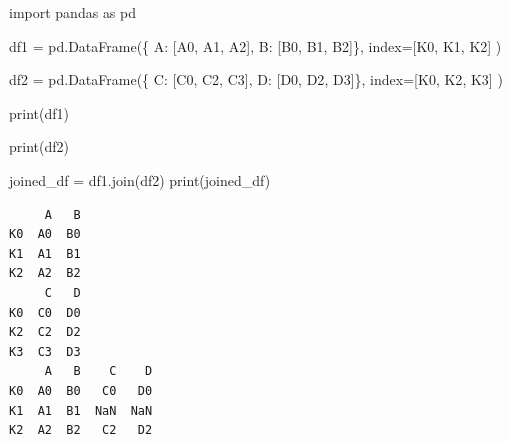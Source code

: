 \documentclass[
  polish,
  letterpaper,
  DIV=11,
  numbers=noendperiod]{scrreprt}
\newenvironment{Shaded}{\begin{snugshade}}{\end{snugshade}}
\newcommand{\BuiltInTok}[1]{\textcolor[rgb]{0.00,0.23,0.31}{#1}}
\newcommand{\ImportTok}[1]{\textcolor[rgb]{0.00,0.46,0.62}{#1}}
\newcommand{\NormalTok}[1]{\textcolor[rgb]{0.00,0.23,0.31}{#1}}
\newcommand{\OperatorTok}[1]{\textcolor[rgb]{0.37,0.37,0.37}{#1}}
\newcommand{\StringTok}[1]{\textcolor[rgb]{0.13,0.47,0.30}{#1}}
\begin{document}
\begin{Shaded}
\begin{Highlighting}[]
\ImportTok{import}\NormalTok{ pandas }\ImportTok{as}\NormalTok{ pd}

\NormalTok{df1 }\OperatorTok{=}\NormalTok{ pd.DataFrame(\{}
    \StringTok{\textquotesingle{}A\textquotesingle{}}\NormalTok{: [}\StringTok{\textquotesingle{}A0\textquotesingle{}}\NormalTok{, }\StringTok{\textquotesingle{}A1\textquotesingle{}}\NormalTok{, }\StringTok{\textquotesingle{}A2\textquotesingle{}}\NormalTok{],}
    \StringTok{\textquotesingle{}B\textquotesingle{}}\NormalTok{: [}\StringTok{\textquotesingle{}B0\textquotesingle{}}\NormalTok{, }\StringTok{\textquotesingle{}B1\textquotesingle{}}\NormalTok{, }\StringTok{\textquotesingle{}B2\textquotesingle{}}\NormalTok{]\},}
\NormalTok{    index}\OperatorTok{=}\NormalTok{[}\StringTok{\textquotesingle{}K0\textquotesingle{}}\NormalTok{, }\StringTok{\textquotesingle{}K1\textquotesingle{}}\NormalTok{, }\StringTok{\textquotesingle{}K2\textquotesingle{}}\NormalTok{]}
\NormalTok{)}

\NormalTok{df2 }\OperatorTok{=}\NormalTok{ pd.DataFrame(\{}
    \StringTok{\textquotesingle{}C\textquotesingle{}}\NormalTok{: [}\StringTok{\textquotesingle{}C0\textquotesingle{}}\NormalTok{, }\StringTok{\textquotesingle{}C2\textquotesingle{}}\NormalTok{, }\StringTok{\textquotesingle{}C3\textquotesingle{}}\NormalTok{],}
    \StringTok{\textquotesingle{}D\textquotesingle{}}\NormalTok{: [}\StringTok{\textquotesingle{}D0\textquotesingle{}}\NormalTok{, }\StringTok{\textquotesingle{}D2\textquotesingle{}}\NormalTok{, }\StringTok{\textquotesingle{}D3\textquotesingle{}}\NormalTok{]\},}
\NormalTok{    index}\OperatorTok{=}\NormalTok{[}\StringTok{\textquotesingle{}K0\textquotesingle{}}\NormalTok{, }\StringTok{\textquotesingle{}K2\textquotesingle{}}\NormalTok{, }\StringTok{\textquotesingle{}K3\textquotesingle{}}\NormalTok{]}
\NormalTok{)}

\BuiltInTok{print}\NormalTok{(df1)}

\BuiltInTok{print}\NormalTok{(df2)}

\NormalTok{joined\_df }\OperatorTok{=}\NormalTok{ df1.join(df2)}
\BuiltInTok{print}\NormalTok{(joined\_df)}
\end{Highlighting}
\end{Shaded}

\begin{verbatim}
     A   B
K0  A0  B0
K1  A1  B1
K2  A2  B2
     C   D
K0  C0  D0
K2  C2  D2
K3  C3  D3
     A   B    C    D
K0  A0  B0   C0   D0
K1  A1  B1  NaN  NaN
K2  A2  B2   C2   D2
\end{verbatim}
\end{document}
